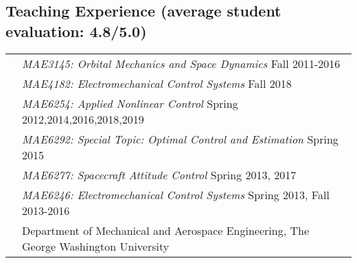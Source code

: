 \documentclass[10pt]{article}
\begin{document}
\vspace*{0.2cm}

\setlength{\tabcolsep}{0cm}
\subsection*{Teaching Experience \textnormal{\normalsize (average student evaluation: 4.8/5.0)}}
\begin{tabularx}{\textwidth}{>{\setlength{\hsize}{0.5cm}}X%
X}
&\textit{MAE3145: Orbital Mechanics and Space Dynamics} \hfill Fall 2011-2016\\
&\textit{MAE4182: Electromechanical Control Systems} \hfill Fall 2018\\
&\textit{MAE6254: Applied Nonlinear Control} \hfill Spring 2012,2014,2016,2018,2019\\
&\textit{MAE6292: Special Topic: Optimal Control and Estimation} \hfill Spring 2015\\
&\textit{MAE6277: Spacecraft Attitude Control} \hfill Spring 2013, 2017\\
&\textit{MAE6246: Electromechanical Control Systems} \hfill Spring 2013, Fall 2013-2016\\
&Department of Mechanical and Aerospace Engineering, The George Washington University\vspace*{0.30cm}\\


\end{tabularx}
\end{document}
